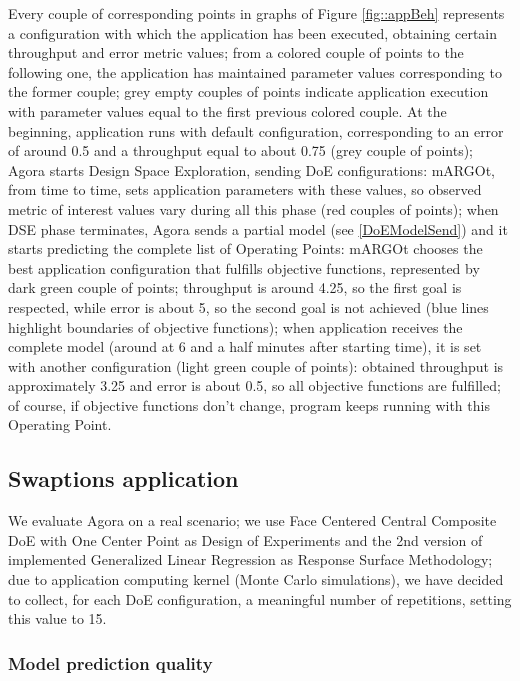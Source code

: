 Every couple of corresponding points in graphs of Figure \ref{fig::appBeh} represents a configuration with which the application has been executed, obtaining certain throughput and error metric values; from a colored couple of points to the following one, the application has maintained parameter values corresponding to the former couple; grey empty couples of points indicate application execution with parameter values equal to the first previous colored couple. At the beginning, application runs with default configuration, corresponding to an error of around 0.5 and a throughput equal to about 0.75 (grey couple of points); Agora starts Design Space Exploration, sending DoE configurations: mARGOt, from time to time, sets application parameters with these values, so observed metric of interest values vary during all this phase (red couples of points); when DSE phase terminates, Agora sends a partial model (see \ref{DoEModelSend}) and it starts predicting the complete list of Operating Points: mARGOt chooses the best application configuration that fulfills objective functions, represented by dark green couple of points; throughput is around 4.25, so the first goal is respected, while error is about 5, so the second goal is not achieved (blue lines highlight boundaries of objective functions); when application receives the complete model (around at 6 and a half minutes after starting time), it is set with another configuration (light green couple of points): obtained throughput is approximately 3.25 and error is about 0.5, so all objective functions are fulfilled; of course, if objective functions don't change, program keeps running with this Operating Point.




\subsection{Swaptions application}

We evaluate Agora on a real scenario; we use Face Centered Central Composite DoE with One Center Point as Design of Experiments and the 2nd version of implemented Generalized Linear Regression as Response Surface Methodology; due to application computing kernel (Monte Carlo simulations), we have decided to collect, for each DoE configuration, a meaningful number of repetitions, setting this value to 15.


\subsubsection{Model prediction quality}

